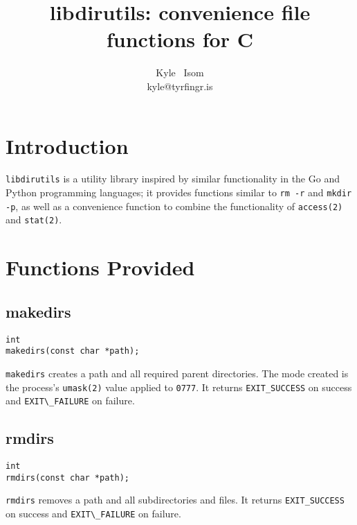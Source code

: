 \documentclass[10pt,letterpaper]{article}
\title{libdirutils: convenience file functions for C}\author{Kyle ~Isom\\kyle@tyrfingr.is}
\begin{document}
\maketitle
\section*{Introduction}
\verb|libdirutils| is a utility library inspired by similar functionality
in the Go and Python programming languages; it provides functions similar
to \verb|rm -r| and \verb|mkdir -p|, as well as a convenience function to
combine the functionality of \verb|access(2)| and \verb|stat(2)|.

\section*{Functions Provided}
\subsection*{makedirs}
\begin{verbatim}
int
makedirs(const char *path);
\end{verbatim}
\verb|makedirs| creates a path and all required parent directories. The mode
created is the process's \verb|umask(2)| value applied to \verb|0777|.
It returns \verb|EXIT_SUCCESS| on success and \verb|EXIT\_FAILURE| on failure.

\subsection*{rmdirs}
\begin{verbatim}
int
rmdirs(const char *path);
\end{verbatim}
\verb|rmdirs| removes a path and all subdirectories and files.
It returns \verb|EXIT_SUCCESS| on success and \verb|EXIT\_FAILURE| on failure.
\end{document}
